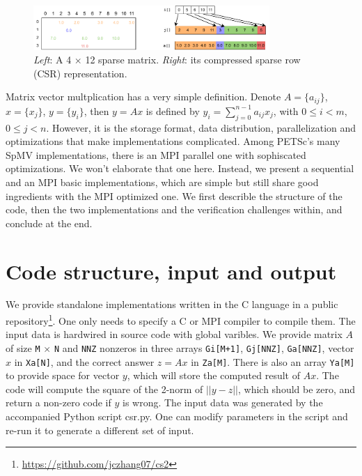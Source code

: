 \documentclass[submission]{eptcs}
\begin{document}
\begin{figure}[h]
  \centering
  \includegraphics[width=0.8\textwidth]{figs/SEQCSR.pdf}
  \caption{{\it Left}: A 4 $\times$ 12 sparse matrix. {\it Right}:  its compressed sparse row (CSR) representation.}
  \label{fig:seqcsr}
\end{figure}

Matrix vector multplication has a very simple definition.
Denote $A = \{a_{ij}\}$, $x = \{x_j\}$, $y = \{y_i\}$, then $y = Ax$ is defined by
$y_i = \sum_{j=0}^{n-1}a_{ij} x_j$, with $0\leq i < m$, $0 \leq j < n$.
However, it is the storage format, data distribution, parallelization and optimizations
that make implementations complicated.
Among PETSc's many SpMV implementations,
there is an MPI parallel one with sophiscated optimizations.
We won't elaborate that one here.
Instead, we present a sequential and an MPI basic implementations, which are simple but still share good
ingredients with the MPI optimized one.
We first describle the structure of the code, then the two implementations and the verification challenges within, and conclude at the end.

\section{Code structure, input and output}
We provide standalone implementations written in the C language in a
public repository\footnote{\url{https://github.com/jczhang07/cs2}}.
One only needs to specify a C or MPI compiler to compile them.
The input data is hardwired in source code with global varibles.
We provide matrix $A$ of size {\tt M} $\times$ {\tt N} and {\tt NNZ} nonzeros in three arrays
{\tt Gi[M+1]}, {\tt Gj[NNZ]}, {\tt Ga[NNZ]},
vector $x$ in {\tt Xa[N]}, and the correct answer $z = Ax$ in {\tt Za[M]}. There is also an array {\tt Ya[M]}
to provide space for vector $y$, which will store the computed result of $Ax$. The code will compute the square of
the 2-norm of $|| y - z ||$, which should be zero, and return a non-zero code if $y$ is wrong.
The input data was generated by the accompanied Python script csr.py. One can modify parameters in the script and re-run
it to generate a different set of input.
\end{document}
